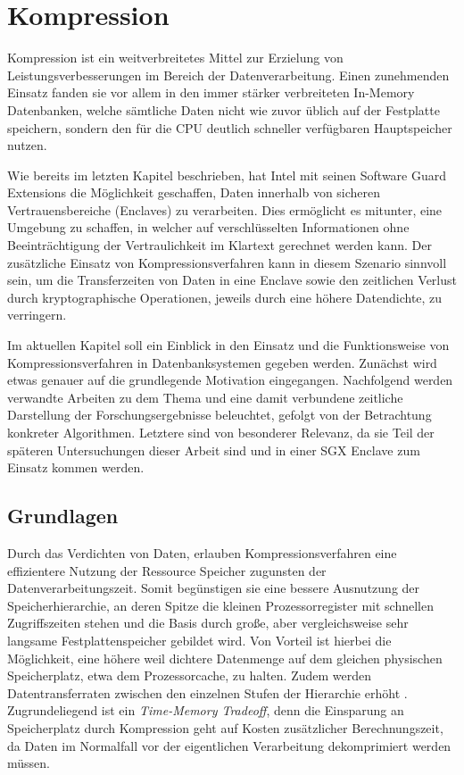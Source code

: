 
\chapter{Kompression}

Kompression ist ein weitverbreitetes Mittel zur Erzielung von Leistungsverbesserungen im Bereich der Datenverarbeitung. Einen zunehmenden Einsatz fanden sie vor allem in den immer stärker verbreiteten In-Memory Datenbanken, welche sämtliche Daten nicht wie zuvor üblich auf der Festplatte speichern, sondern den für die \ac{CPU} deutlich schneller verfügbaren Hauptspeicher nutzen.

Wie bereits im letzten Kapitel beschrieben, hat Intel mit seinen Software Guard Extensions die Möglichkeit geschaffen, Daten innerhalb von sicheren Vertrauensbereiche (Enclaves) zu verarbeiten. Dies ermöglicht es mitunter, eine Umgebung zu schaffen, in welcher auf verschlüsselten Informationen ohne Beeinträchtigung der Vertraulichkeit im Klartext gerechnet werden kann. Der zusätzliche Einsatz von Kompressionsverfahren kann in diesem Szenario sinnvoll sein, um die Transferzeiten von Daten in eine Enclave sowie den zeitlichen Verlust durch kryptographische Operationen, jeweils durch eine höhere Datendichte, zu verringern.

Im aktuellen Kapitel soll ein Einblick in den Einsatz und die Funktionsweise von Kompressionsverfahren in Datenbanksystemen gegeben werden. Zunächst wird etwas genauer auf die grundlegende Motivation eingegangen. Nachfolgend werden verwandte Arbeiten zu dem Thema und eine damit verbundene zeitliche Darstellung der Forschungsergebnisse beleuchtet, gefolgt von der Betrachtung konkreter Algorithmen. Letztere sind von besonderer Relevanz, da sie Teil der späteren Untersuchungen dieser Arbeit sind und in einer \ac{SGX} Enclave zum Einsatz kommen werden.

\section{Grundlagen}

Durch das Verdichten von Daten, erlauben Kompressionsverfahren eine effizientere Nutzung der Ressource Speicher zugunsten der Datenverarbeitungszeit. Somit begünstigen sie eine bessere Ausnutzung der Speicherhierarchie, an deren Spitze die kleinen Prozessorregister mit schnellen Zugriffszeiten stehen und die Basis durch große, aber vergleichsweise sehr langsame Festplattenspeicher gebildet wird. Von Vorteil ist hierbei die Möglichkeit, eine höhere weil dichtere Datenmenge auf dem gleichen physischen Speicherplatz, etwa dem Prozessorcache, zu halten. Zudem werden Datentransferraten zwischen den einzelnen Stufen der Hierarchie erhöht \cite{Croft2009}. Zugrundeliegend ist ein \textit{Time-Memory Tradeoff}, denn die Einsparung an Speicherplatz durch Kompression geht auf Kosten zusätzlicher Berechnungszeit, da Daten im Normalfall vor der eigentlichen Verarbeitung dekomprimiert werden müssen.

